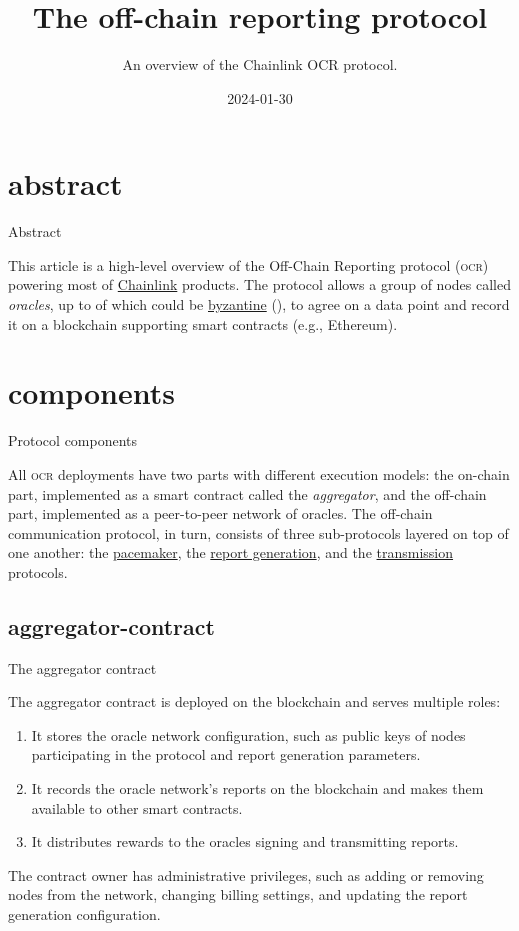 \documentclass{article}
\title{The off-chain reporting protocol}
\subtitle{An overview of the Chainlink OCR protocol.}
\date{2024-01-30}
\begin{document}
\section{abstract}{Abstract}

This article is a high-level overview of the Off-Chain Reporting protocol (\textsc{ocr}) powering most of \href{https://chain.link/}{Chainlink} products.
The protocol allows a group of  nodes called \emph{oracles}, up to  of which could be \href{https://en.wikipedia.org/wiki/Byzantine_fault}{byzantine} (), to agree on a data point and record it on a blockchain supporting smart contracts (e.g., Ethereum).

\section{components}{Protocol components}

All \textsc{ocr} deployments have two parts with different execution models: the on-chain part, implemented as a smart contract called the \emph{aggregator}, and the off-chain part, implemented as a peer-to-peer network of oracles.
The off-chain communication protocol, in turn, consists of three sub-protocols layered on top of one another: the \href{#pacemaker}{pacemaker}, the \href{#report-generation}{report generation}, and the \href{#transmission}{transmission} protocols. 

\subsection{aggregator-contract}{The aggregator contract}

The aggregator contract is deployed on the blockchain and serves multiple roles:
\begin{enumerate}
    \item It stores the oracle network configuration, such as public keys of nodes participating in the protocol and report generation parameters.
    \item It records the oracle network's reports on the blockchain and makes them available to other smart contracts.
    \item It distributes rewards to the oracles signing and transmitting reports.
\end{enumerate}

The contract owner has administrative privileges, such as adding or removing nodes from the network, changing billing settings, and updating the report generation configuration.
\end{document}
